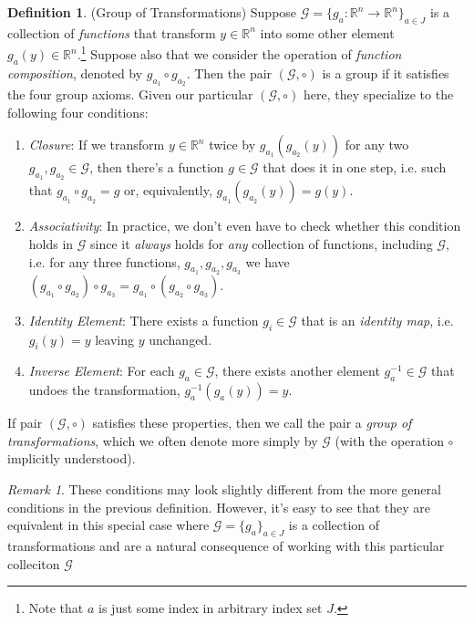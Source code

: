 \documentclass[12pt]{book}
\numberwithin{equation}{section} %
\theoremstyle{plain}
\theoremstyle{definition}
\newtheorem{defn}[thm]{Definition}
\theoremstyle{remark}
\newtheorem*{rmk}{Remark}
\newcommand{\ra}{\rightarrow}
\newcommand{\calG}{\mathcal{G}}
\newcommand{\R}{\mathbb{R}}
\newcommand{\Rn}{\mathbb{R}^n}
\begin{document}
\begin{defn}(Group of Transformations)
Suppose $\calG=\{g_a:\R^n\ra\R^n\}_{a\in J}$ is a collection
of \emph{functions} that transform $y\in\Rn$ into some other element
$g_a(y)\in\Rn$.\footnote{%
  Note that $a$ is just some index in arbitrary index set $J$.
}
Suppose also that we consider the operation
of \emph{function composition}, denoted by $g_{a_1}\circ
g_{a_2}$.
Then the pair $(\calG,\circ)$ is a group if it satisfies the four group
axioms. Given our particular $(\calG,\circ)$ here, they specialize to
the following four conditions:
\begin{enumerate}[label=(\roman*)]
  \item \emph{Closure}:
    If we transform $y\in\Rn$ twice by $g_{a_1}(g_{a_2}(y))$
    for any two $g_{a_1},g_{a_2}\in\calG$, then there's a
    function $g\in\calG$ that does it in one step, i.e. such that
    $g_{a_1}\circ g_{a_2}=g$ or, equivalently,
    $g_{a_1}(g_{a_2}(y))=g(y)$.

  \item \emph{Associativity}:
    In practice, we don't even have to check whether this condition
    holds in $\calG$ since it \emph{always} holds for \emph{any}
    collection of functions, including $\calG$, i.e.
    for any three functions,
    $g_{a_1},g_{a_2},g_{a_3}$
    we have $(g_{a_1}\circ g_{a_2})\circ g_{a_3} =
    g_{a_1} \circ (g_{a_2}\circ g_{a_3})$.

  \item \emph{Identity Element}:
    There exists a function $g_i\in\calG$ that is an
    \emph{identity map}, i.e. $g_i(y)=y$ leaving $y$ unchanged.

  \item \emph{Inverse Element}:
    For each $g_a\in\calG$, there exists another element
    $g_{a}^{-1}\in\calG$ that undoes the transformation,
    $g^{-1}_a(g_{a}(y))=y$.
\end{enumerate}
If pair $(\calG,\circ)$ satisfies these properties, then we call the
pair a \emph{group of transformations}, which we often denote more
simply by $\calG$ (with the operation $\circ$ implicitly understood).
\end{defn}
\begin{rmk}
These conditions may look slightly different from the more general
conditions in the previous definition.
However, it's easy to see that they are equivalent in this special case
where $\calG=\{g_a\}_{a\in J}$ is a collection of transformations
and are a natural consequence of working with this particular colleciton
$\calG$
\end{rmk}
\end{document}
